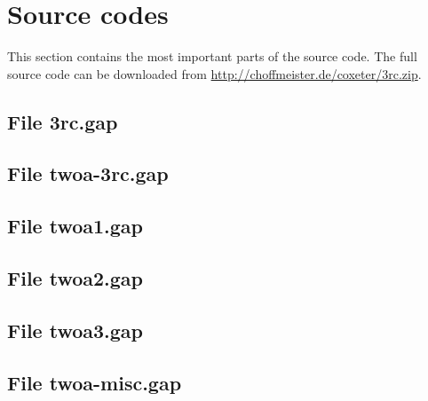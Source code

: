 \chapter{Source codes}
\label{sec:sourcecodes}

This section contains the most important parts of the source code. The full source code can be downloaded from \url{http://choffmeister.de/coxeter/3rc.zip}.

\section*{File 3rc.gap}
\label{file:3rc}



\section*{File twoa-3rc.gap}
\label{file:twoa-3rc}



\section*{File twoa1.gap}
\label{file:twoa1}



\section*{File twoa2.gap}
\label{file:twoa2}



\section*{File twoa3.gap}
\label{file:twoa3}



\section*{File twoa-misc.gap}
\label{file:twoa-misc}

